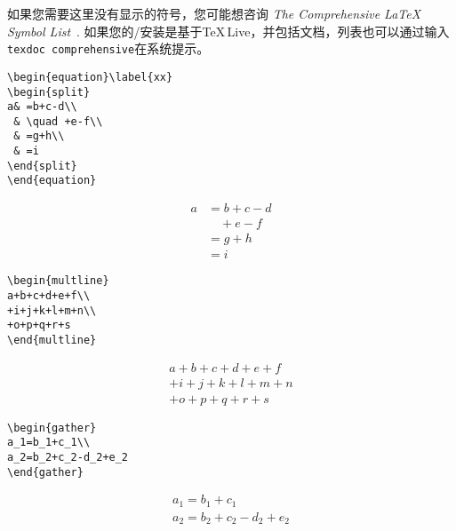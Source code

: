 如果您需要这里没有显示的符号，您可能想咨询 \emph{The Comprehensive \LaTeX{} Symbol List}~\cite{comprehensive}.
如果您的\lat/安装是基于\TeX\,Live，并包括文档，列表也可以通过输入\texttt{texdoc comprehensive}在系统提示。
\begin{table}[!htbp]
\caption[]{多线方程和方程组\\
 \phantom{Table 1:} (竖线表示标称边缘).}
\label{displays}
\bigskip
\begin{makeimage}
\begin{minipage}{\textwidth}
\begin{eqxample}
\begin{verbatim}
\begin{equation}\label{xx}
\begin{split}
a& =b+c-d\\
 & \quad +e-f\\
 & =g+h\\
 & =i
\end{split}
\end{equation}
\end{verbatim}
\producing
\begin{equation}\label{xx}
\begin{split}
a& =b+c-d\\
 & \quad +e-f\\
 & =g+h\\
 & =i
\end{split}
\end{equation}
\end{eqxample}

\begin{eqxample}
\begin{verbatim}
\begin{multline}
a+b+c+d+e+f\\
+i+j+k+l+m+n\\
+o+p+q+r+s
\end{multline}
\end{verbatim}
\producing
\begin{multline}
a+b+c+d+e+f\\
+i+j+k+l+m+n\\
+o+p+q+r+s
\end{multline}
\end{eqxample}

\begin{eqxample}
\begin{verbatim}
\begin{gather}
a_1=b_1+c_1\\
a_2=b_2+c_2-d_2+e_2
\end{gather}
\end{verbatim}
\producing
\begin{gather}
a_1=b_1+c_1\\
a_2=b_2+c_2-d_2+e_2
\end{gather}
\end{eqxample}


\end{minipage}
\end{makeimage}
\end{table}
